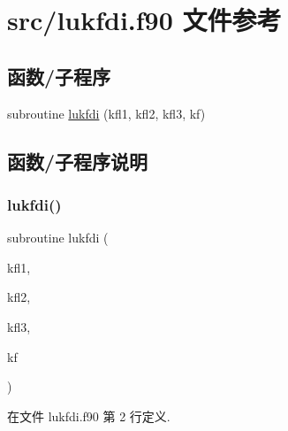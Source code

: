 \hypertarget{lukfdi_8f90}{}\section{src/lukfdi.f90 文件参考}
\label{lukfdi_8f90}
\subsection*{函数/子程序}
\begin{DoxyCompactItemize}
\item 
subroutine \mbox{\hyperlink{lukfdi_8f90_acb067c61a00a25ea88d92d4db611b7b7}{lukfdi}} (kfl1, kfl2, kfl3, kf)
\end{DoxyCompactItemize}


\subsection{函数/子程序说明}
\mbox{\label{lukfdi_8f90_acb067c61a00a25ea88d92d4db611b7b7}} 
\subsubsection{\texorpdfstring{lukfdi()}{lukfdi()}}
{\footnotesize\ttfamily subroutine lukfdi (\begin{DoxyParamCaption}\item[{}]{kfl1,  }\item[{}]{kfl2,  }\item[{}]{kfl3,  }\item[{}]{kf }\end{DoxyParamCaption})}



在文件 lukfdi.\+f90 第 2 行定义.

